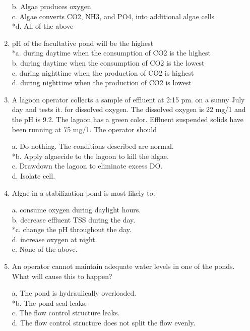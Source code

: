 \begin{enumerate}
b. Algae produces oxygen \\

c. Algae converts CO2, NH3, and PO4, into additional algae cells \\

*d. All of the above \\


\item  pH of the facultative pond will be the highest \\


*a. during daytime when the consumption of CO2 is the highest \\

b. during daytime when the consumption of CO2 is the lowest \\

c. during nighttime when the production of CO2 is highest \\

d. during nighttime when the production of CO2 is lowest \\


\item  A lagoon operator collects a sample of effluent at 2:15 pm. on a sunny July day and tests it. for dissolved oxygen. The dissolved oxygen is 22 mg/1 and the pH is 9.2. The lagoon has a green color. Effluent suspended solids have been running at 75 mg/1. The operator should 

a. Do nothing. The conditions described are normal. \\
*b. Apply algaecide to the lagoon to kill the algae. \\
c. Drawdown the lagoon to eliminate excess DO. \\
d. Isolate cell. 


\item  Algae in a stabilization pond is most likely to: 

a. consume oxygen during daylight hours. \\
b. decrease effluent TSS during the day. \\
*c. change the pH throughout the day. \\
d. increase oxygen at night. \\
e. None of the above. 


\item  An operator cannot maintain adequate water levels in one of the ponds. What will cause this to happen? 

a. The pond is hydraulically overloaded. \\
*b. The pond seal leaks. \\
c. The flow control structure leaks. \\
d. The flow control structure does not split the flow evenly. 



\end{enumerate}
